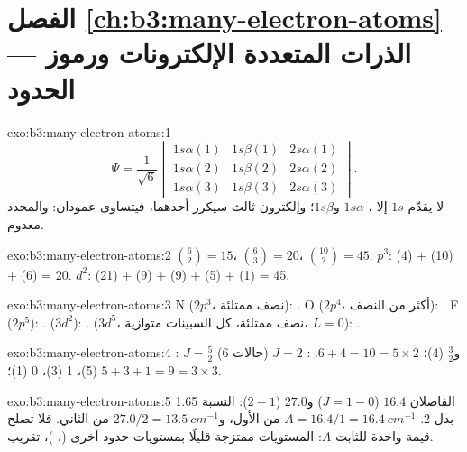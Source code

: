 \section*{الفصل \ref{ch:b3:many-electron-atoms} --- الذرات المتعددة الإلكترونات ورموز الحدود}

\begin{solution}{exo:b3:many-electron-atoms:1}
\[
\Psi = \frac{1}{\sqrt6}\begin{vmatrix}1s\alpha(1) & 1s\beta(1) & 2s\alpha(1)\\
1s\alpha(2) & 1s\beta(2) & 2s\alpha(2)\\ 1s\alpha(3) & 1s\beta(3) & 2s\alpha(3)
\end{vmatrix}.
\]
لا يقدّم $1s$ إلا ، $1s\alpha$ و$1s\beta$؛ وإلكترون ثالث
سيكرر أحدهما، فيتساوى عمودان: والمحدد معدوم.
\end{solution}

\begin{solution}{exo:b3:many-electron-atoms:2}
$\binom62 = 15$، $\binom63 = 20$، $\binom{10}{2} = 45$. $p^3$:  (4) +
 (10) +  (6) = 20. $d^2$:  (21) +  (9) +  (9) +
 (5) +  (1) = 45.
\end{solution}

\begin{solution}{exo:b3:many-electron-atoms:3}
N ($2p^3$، نصف ممتلئة): . O ($2p^4$، أكثر من النصف):
. F ($2p^5$): .  ($3d^2$):
.  ($3d^5$، نصف ممتلئة، كل السبينات متوازية، $L = 0$):
.
\end{solution}

\begin{solution}{exo:b3:many-electron-atoms:4}
: $J = \frac52$ (6 حالات) و$\frac32$ (4)؛ $6 + 4 = 10 = 5 \times 2$.
: $J = 2$ (5)، 1 (3)، 0 (1)؛ $5 + 3 + 1 = 9 = 3 \times 3$.
\end{solution}

\begin{solution}{exo:b3:many-electron-atoms:5}
الفاصلان $16.4$ ($J = 1 - 0$) و$27.0$ ($2 - 1$): النسبة 1.65 بدل 2.
$A = 16.4/1 = \qty{16.4}{cm^{-1}}$ من الأول، و$27.0/2 = \qty{13.5}{cm^{-1}}$
من الثاني. فلا تصلح قيمة واحدة للثابت $A$: المستويات ممتزجة قليلًا بمستويات
حدود أخرى (، )، 
تقريب.
\end{solution}

